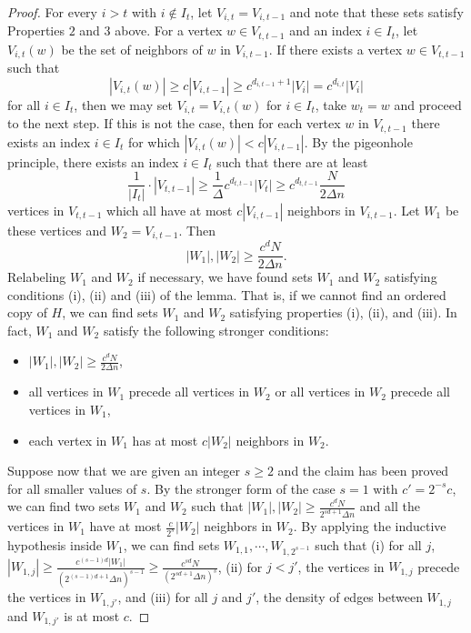 \documentclass[11pt]{article}
\begin{document}
\begin{proof}
For every $i > t$ with $i\notin I_{t}$, let $V_{i,t}=V_{i,t-1}$
and note that these sets satisfy Properties $2$ and $3$ above. For
a vertex $w\in V_{t,t-1}$ and an index $i\in I_{t}$, let $V_{i,t}(w)$
be the set of neighbors of $w$ in $V_{i,t-1}$. If there exists
a vertex $w\in V_{t,t-1}$ such that 
\[
|V_{i,t}(w)|\ge c |V_{i,t-1}|\ge c^{d_{i,t-1}+1} |V_{i}| =c^{d_{i,t}} |V_i|
\]
 for all $i\in I_{t}$, then we may set $V_{i,t}=V_{i,t}(w)$ for
$i\in I_{t}$, take $w_t = w$ and proceed to the next step.
If this is not the case, then for each vertex $w$ in $V_{t,t-1}$ there
exists an index $i\in I_{t}$ for which $|V_{i,t}(w)|< c |V_{i,t-1}|$.
By the pigeonhole principle, there exists an index $i\in I_{t}$ such
that there are at least 
\[
\frac{1}{|I_{t}|}\cdot|V_{t,t-1}|\ge\frac{1}{\Delta} c^{d_{t,t-1}} |V_t|\ge c^{d_{t,t-1}}\frac{N}{2 \Delta n}
\]
vertices in $V_{t,t-1}$ which all have at most $c |V_{i,t-1}|$
neighbors in $V_{i,t-1}$. Let $W_{1}$ be these vertices and $W_{2} = V_{i,t-1}$. Then
\[
|W_{1}|, |W_{2}|\ge\frac{c^d N}{2\Delta n}.
\]
Relabeling $W_1$ and $W_2$ if necessary, we have found sets $W_{1}$ and $W_{2}$ satisfying conditions (i), (ii) and (iii) of the lemma. 
That is, if we cannot find an ordered copy of $H$, we can find sets $W_{1}$ and $W_{2}$ satisfying properties
(i), (ii), and (iii). In fact, $W_1$ and $W_2$ satisfy the following stronger conditions:
\begin{itemize}

\item[(i')] 
$|W_{1}|, |W_{2}|\ge\frac{c^d N}{2\Delta n}$,

\item[(ii')] 
all vertices in $W_{1}$ precede all vertices in $W_{2}$ or all vertices in $W_2$ precede all vertices in $W_1$,

\item[(iii')] 
each vertex in $W_{1}$ has at most $c |W_{2}|$ neighbors in $W_{2}$.

\end{itemize}

Suppose now that we are given an integer $s\ge2$ and the claim has been
proved for all smaller values of $s$. By the stronger form of the
case $s=1$ with $c'=2^{-s}c$, we can find two sets $W_{1}$ and $W_{2}$
such that $|W_{1}|,|W_{2}|\ge\frac{c^d N}{2^{sd+1} \Delta n}$ and all the
vertices in $W_{1}$ have at most $\frac{c}{2^{s}}|W_{2}|$ neighbors
in $W_{2}$. By applying the inductive hypothesis inside $W_{1}$, we
can find sets $W_{1,1},\cdots,W_{1,2^{s-1}}$ such that (i) for all $j$, $|W_{1,j}|\ge\frac{c^{(s-1)d}|W_1|}{(2^{(s-1)d + 1} \Delta n)^{s-1}} \geq \frac{c^{sd}N}{(2^{sd + 1} \Delta n)^s}$,
(ii) for $j<j'$, the vertices in $W_{1,j}$ precede the
vertices in $W_{1,j'}$, and (iii) for all $j$ and $j'$, the density
of edges between $W_{1,j}$ and $W_{1,j'}$ is at most $c$. 


\end{proof}
\end{document}
